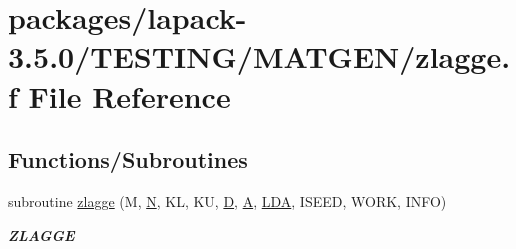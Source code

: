 \hypertarget{zlagge_8f}{}\section{packages/lapack-\/3.5.0/\+T\+E\+S\+T\+I\+N\+G/\+M\+A\+T\+G\+E\+N/zlagge.f File Reference}
\label{zlagge_8f}
\subsection*{Functions/\+Subroutines}
\begin{DoxyCompactItemize}
\item 
subroutine \hyperlink{group__complex16__matgen_gaeb5ac1c437527a2ed37e9378d6ed3182}{zlagge} (M, \hyperlink{polmisc_8c_a0240ac851181b84ac374872dc5434ee4}{N}, K\+L, K\+U, \hyperlink{odrpack_8h_a7dae6ea403d00f3687f24a874e67d139}{D}, \hyperlink{classA}{A}, \hyperlink{example__user_8c_ae946da542ce0db94dced19b2ecefd1aa}{L\+D\+A}, I\+S\+E\+E\+D, W\+O\+R\+K, I\+N\+F\+O)
\begin{DoxyCompactList}\small\item\em {\bfseries Z\+L\+A\+G\+G\+E} \end{DoxyCompactList}\end{DoxyCompactItemize}
